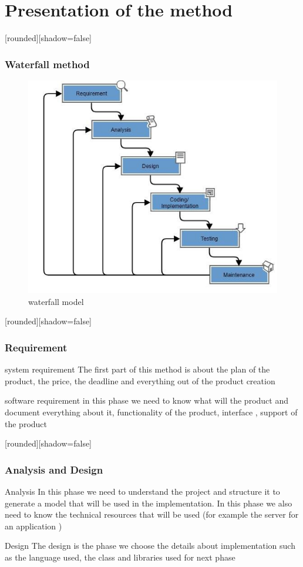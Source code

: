 \documentclass[10pt]{beamer}
\begin{document}
\section{Presentation of the method}
\begin{frame}
[rounded][shadow=false]
\frametitle{Waterfall method}
\begin{figure}
    \centering
    \includegraphics[width=0.5\linewidth]{waterfall method.png}
    \caption{waterfall model}
\end{figure}
\end{frame}
\begin{frame}
[rounded][shadow=false]
\frametitle{Requirement}

\begin{block}{system requirement}
The first part of this method is about the plan of the product, the price, the deadline and everything out of the product creation
\end{block}

\begin{block}{software requirement}
in this phase we need to know what will the product and document everything about it, functionality of the product, interface , support of the product  
\end{block}
\end{frame}
\begin{frame}
[rounded][shadow=false]
\frametitle{Analysis and Design}

\begin{block}{Analysis}
In this phase we need to understand the project and structure it to generate a model that will be used in the implementation. In this phase we also need to know the technical resources that will be used (for example the server for an application )
\end{block}
\begin{block}{Design}
The design is the phase we choose the details about implementation such as the language used, the class and libraries used for next phase

\end{block}
\end{frame}
\end{document}

